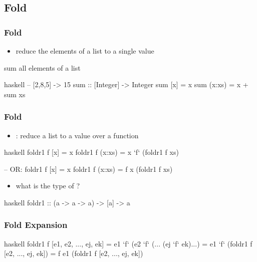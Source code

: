 \documentclass[dvipsnames]{beamer}
\theoremstyle{plain}
\begin{document}
\subsection{Fold}

\begin{frame}[fragile]
  \frametitle{Fold}

  \begin{itemize}
    \item reduce the elements of a list to a single value
  \end{itemize}

  \begin{exampleblock}{sum all elements of a list}
    \begin{pygments}{haskell}
-- [2,8,5] -> 15
sum :: [Integer] -> Integer
sum [x]    = x
sum (x:xs) = x + sum xs
    \end{pygments}
  \end{exampleblock}
\end{frame}

\begin{frame}[fragile]
  \frametitle{Fold}

  \begin{itemize}
    \item {}: reduce a list to a value over a function
  \end{itemize}

  \begin{exampleblock}{}
    \begin{pygments}{haskell}
foldr1 f [x]    = x
foldr1 f (x:xs) = x `f` (foldr1 f xs)

-- OR:
foldr1 f [x]    = x
foldr1 f (x:xs) = f x (foldr1 f xs)
    \end{pygments}
  \end{exampleblock}

  \pause
  \begin{itemize}
    \item what is the type of ?
  \end{itemize}

  \begin{pygments}{haskell}
foldr1 :: (a -> a -> a) -> [a] -> a
  \end{pygments}
\end{frame}

\begin{frame}[fragile]
  \frametitle{Fold Expansion}

  \begin{block}{}
    \begin{pygments}{haskell}
foldr1 f [e1, e2, ..., ej, ek]
    = e1 `f` (e2 `f` (... (ej `f` ek)...)
    = e1 `f` (foldr1 f [e2, ..., ej, ek])
    = f e1 (foldr1 f [e2, ..., ej, ek])
    \end{pygments}
  \end{block}
\end{frame}
\end{document}
